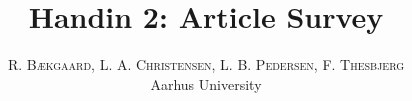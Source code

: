 \documentclass[twoside,10pt]{article} %
\title{\vspace{-15mm}\fontsize{24pt}{10pt}\selectfont\textbf{Handin 2: Article Survey}} %
\author{
\large
\textsc{R. Bækgaard, L. A. Christensen, L. B. Pedersen, F. Thesbjerg}\\[2mm] %
\normalsize Aarhus University %
\vspace{-5mm}
}
\date{}
\begin{document}
\maketitle %

\thispagestyle{fancy} %


\begin{abstract}

\end{abstract}


\begin{multicols}{2} %













\end{multicols}
\end{document}
